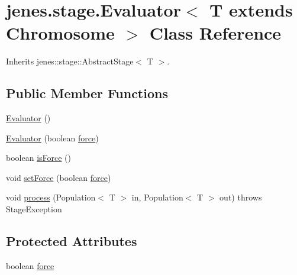 \hypertarget{classjenes_1_1stage_1_1_evaluator_3_01_t_01extends_01_chromosome_01_4}{
\section{jenes.stage.Evaluator$<$ T extends Chromosome $>$ Class Reference}
\label{classjenes_1_1stage_1_1_evaluator_3_01_t_01extends_01_chromosome_01_4}
}
Inherits jenes::stage::AbstractStage$<$ T $>$.

\subsection*{Public Member Functions}
\begin{CompactItemize}
\item 
\hyperlink{classjenes_1_1stage_1_1_evaluator_3_01_t_01extends_01_chromosome_01_4_fe7302209d1e39a0267bf4320d6d298d}{Evaluator} ()
\item 
\hyperlink{classjenes_1_1stage_1_1_evaluator_3_01_t_01extends_01_chromosome_01_4_d156e40a9579040474e6720f14c49919}{Evaluator} (boolean \hyperlink{classjenes_1_1stage_1_1_evaluator_3_01_t_01extends_01_chromosome_01_4_8ad6c1bcd555e06450a444d2d18b6b89}{force})
\item 
boolean \hyperlink{classjenes_1_1stage_1_1_evaluator_3_01_t_01extends_01_chromosome_01_4_617f44ce8de8d0e4bab8506e81038e76}{isForce} ()
\item 
void \hyperlink{classjenes_1_1stage_1_1_evaluator_3_01_t_01extends_01_chromosome_01_4_cd9d554678a83708eeb2d373def60e71}{setForce} (boolean \hyperlink{classjenes_1_1stage_1_1_evaluator_3_01_t_01extends_01_chromosome_01_4_8ad6c1bcd555e06450a444d2d18b6b89}{force})
\item 
void \hyperlink{classjenes_1_1stage_1_1_evaluator_3_01_t_01extends_01_chromosome_01_4_25aee75f7acf2406ca17526f588a8f15}{process} (Population$<$ T $>$ in, Population$<$ T $>$ out)  throws StageException 
\end{CompactItemize}
\subsection*{Protected Attributes}
\begin{CompactItemize}
\item 
boolean \hyperlink{classjenes_1_1stage_1_1_evaluator_3_01_t_01extends_01_chromosome_01_4_8ad6c1bcd555e06450a444d2d18b6b89}{force}
\end{CompactItemize}


